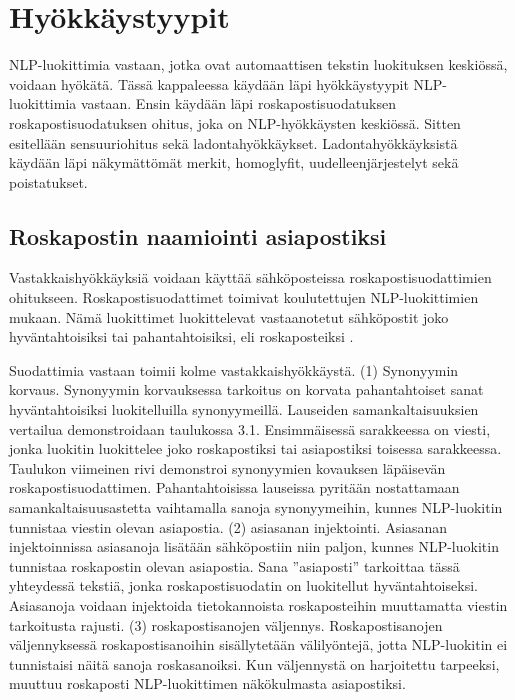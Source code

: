 \chapter{Hyökkäystyypit\label{results}}

NLP-luokittimia vastaan, jotka ovat automaattisen tekstin luokituksen keskiössä, voidaan hyökätä. Tässä kappaleessa käydään läpi hyökkäystyypit NLP-luokittimia vastaan. Ensin käydään läpi roskapostisuodatuksen roskapostisuodatuksen ohitus, joka on NLP-hyökkäysten keskiössä. Sitten esitellään sensuuriohitus sekä ladontahyökkäykset. Ladontahyökkäyksistä käydään läpi näkymättömät merkit, homoglyfit, uudelleenjärjestelyt sekä poistatukset.

\section{Roskapostin naamiointi asiapostiksi}
Vastakkaishyökkäyksiä voidaan käyttää sähköposteissa roskapostisuodattimien ohitukseen. Roskapostisuodattimet toimivat koulutettujen NLP-luokittimien mukaan. Nämä luokittimet luokittelevat vastaanotetut sähköpostit joko hyväntahtoisiksi tai pahantahtoisiksi, eli roskaposteiksi \citep{spamfilter}.

Suodattimia vastaan toimii kolme vastakkaishyökkäystä. (1) Synonyymin korvaus. Synonyymin korvauksessa tarkoitus on korvata pahantahtoiset sanat hyväntahtoisiksi luokitelluilla synonyymeillä. Lauseiden samankaltaisuuksien vertailua demonstroidaan taulukossa 3.1. Ensimmäisessä sarakkeessa on viesti, jonka luokitin luokittelee joko roskapostiksi tai asiapostiksi toisessa sarakkeessa. Taulukon viimeinen rivi demonstroi synonyymien kovauksen läpäisevän roskapostisuodattimen. Pahantahtoisissa lauseissa pyritään nostattamaan samankaltaisuusastetta vaihtamalla sanoja synonyymeihin, kunnes NLP-luokitin tunnistaa viestin olevan asiapostia. (2) asiasanan injektointi. Asiasanan injektoinnissa asiasanoja lisätään sähköpostiin niin paljon, kunnes NLP-luokitin tunnistaa roskapostin olevan asiapostia. Sana ''asiaposti'' tarkoittaa tässä yhteydessä tekstiä, jonka roskapostisuodatin on luokitellut hyväntahtoiseksi. Asiasanoja voidaan injektoida tietokannoista roskaposteihin muuttamatta viestin tarkoitusta rajusti. (3) roskapostisanojen väljennys. Roskapostisanojen väljennyksessä roskapostisanoihin sisällytetään välilyöntejä, jotta NLP-luokitin ei tunnistaisi näitä sanoja roskasanoiksi. Kun väljennystä on harjoitettu tarpeeksi, muuttuu roskaposti NLP-luokittimen näkökulmasta asiapostiksi. \citep{spamfilter}

